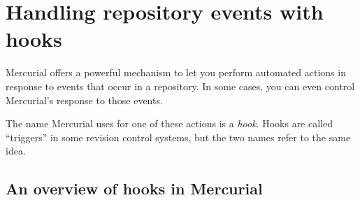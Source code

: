 \chapter{Handling repository events with hooks}
\label{chap:hook}

Mercurial offers a powerful mechanism to let you perform automated
actions in response to events that occur in a repository.  In some
cases, you can even control Mercurial's response to those events.

The name Mercurial uses for one of these actions is a \emph{hook}.
Hooks are called ``triggers'' in some revision control systems, but
the two names refer to the same idea.

\section{An overview of hooks in Mercurial}


